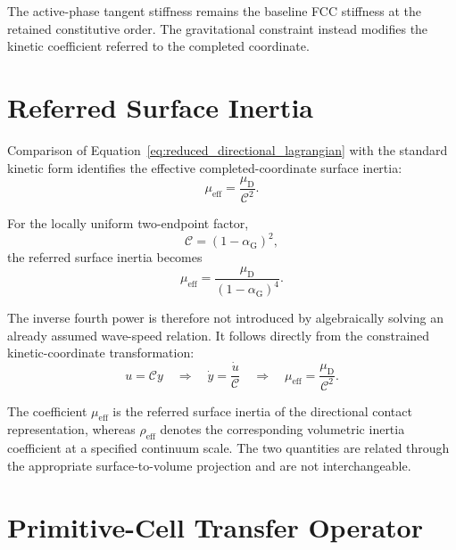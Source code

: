 The active-phase tangent stiffness remains the baseline FCC stiffness at the retained constitutive order. The gravitational constraint instead modifies the kinetic coefficient referred to the completed coordinate.

\section{Referred Surface Inertia}
\label{sec:grav_referred_surface_inertia}

Comparison of Equation~\eqref{eq:reduced_directional_lagrangian} with the standard kinetic form identifies the effective completed-coordinate surface inertia:
\begin{equation}
    \mu_{\mathrm{eff}} = \frac{\mu_{\mathrm{D}}}{\mathcal{C}^2}.
    \label{eq:surface_referred_inertia_general}
\end{equation}

For the locally uniform two-endpoint factor,
\begin{equation}
    \mathcal{C} = \left( 1-\alpha_{\mathrm{G}} \right)^2,
\end{equation}
the referred surface inertia becomes
\begin{equation}
    \mu_{\mathrm{eff}} = \frac{\mu_{\mathrm{D}}} {\left( 1-\alpha_{\mathrm{G}} \right)^4}.
    \label{eq:surface_referred_inertia_alpha}
\end{equation}

The inverse fourth power is therefore not introduced by algebraically solving an already assumed wave-speed relation. It follows directly from the constrained kinetic-coordinate transformation:
\begin{equation}
    u = \mathcal{C}y \quad\Longrightarrow\quad \dot{y} = \frac{\dot{u}}{\mathcal{C}} \quad\Longrightarrow\quad \mu_{\mathrm{eff}} = \frac{\mu_{\mathrm{D}}}{\mathcal{C}^2}.
\end{equation}

The coefficient $\mu_{\mathrm{eff}}$ is the referred surface inertia of the directional contact representation, whereas $\rho_{\mathrm{eff}}$ denotes the corresponding volumetric inertia coefficient at a specified continuum scale. The two quantities are related through the appropriate surface-to-volume projection and are not interchangeable.

\section{Primitive-Cell Transfer Operator}
\label{sec:grav_cell_transfer_operator}


